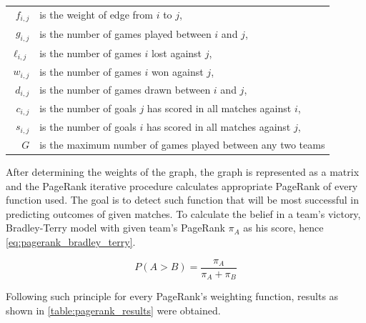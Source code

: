 \vspace{-1.2em}
\begin{table}[H]
\begin{tabular}{rl}
$f_{i,j}$\quad &is the weight of edge from $i$ to $j$,\\
$g_{i,j}$\quad &is the number of games played between $i$ and $j$,\\
$\ell_{i,j}$\quad &is the number of games $i$ lost against $j$,\\
$w_{i,j}$\quad &is the number of games $i$ won against $j$,\\
$d_{i,j}$\quad &is the number of games drawn between $i$ and $j$,\\
$c_{i,j}$\quad &is the number of goals $j$ has scored in all matches against $i$,\\
$s_{i,j}$\quad &is the number of goals $i$ has scored in all matches against $j$,\\
$G$\quad &is the maximum number of games played between any two teams
\end{tabular}
\end{table}
\vspace{-1em}

After determining the weights of the graph, the graph is represented as a matrix and the PageRank iterative procedure calculates appropriate PageRank of every function used. The goal is to detect such function that will be most successful in predicting outcomes of given matches. To calculate the belief in a team's victory, Bradley-Terry model with given team's PageRank $\pi_A$ as his score, hence \eqref{eq:pagerank_bradley_terry}.

\begin{equation}
\label{eq:pagerank_bradley_terry}
P(A > B) = \frac{\pi_A}{\pi_A + \pi_B}
\end{equation}

Following such principle for every PageRank's weighting function, results as shown in \autoref{table:pagerank_results} were obtained.

